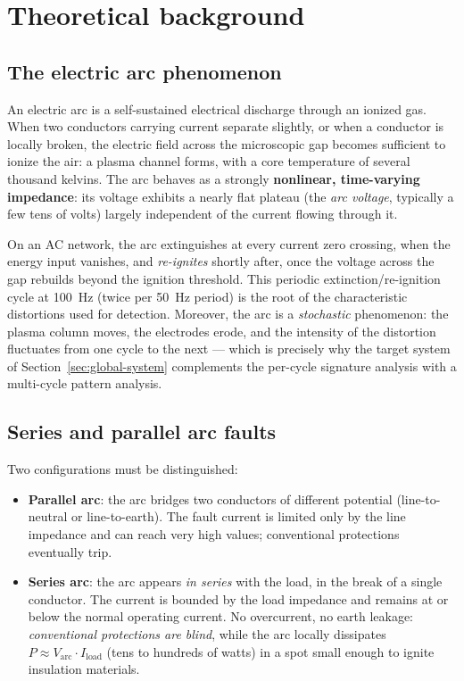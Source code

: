 \section{Theoretical background}

\subsection{The electric arc phenomenon}

An electric arc is a self-sustained electrical discharge through an ionized gas. When two conductors carrying current separate slightly, or when a conductor is locally broken, the electric field across the microscopic gap becomes sufficient to ionize the air: a plasma channel forms, with a core temperature of several thousand kelvins. The arc behaves as a strongly \textbf{nonlinear, time-varying impedance}: its voltage exhibits a nearly flat plateau (the \emph{arc voltage}, typically a few tens of volts) largely independent of the current flowing through it.

\medskip

On an AC network, the arc extinguishes at every current zero crossing, when the energy input vanishes, and \emph{re-ignites} shortly after, once the voltage across the gap rebuilds beyond the ignition threshold. This periodic extinction/re-ignition cycle at 100~Hz (twice per 50~Hz period) is the root of the characteristic distortions used for detection. Moreover, the arc is a \emph{stochastic} phenomenon: the plasma column moves, the electrodes erode, and the intensity of the distortion fluctuates from one cycle to the next --- which is precisely why the target system of Section~\ref{sec:global-system} complements the per-cycle signature analysis with a multi-cycle pattern analysis.

\subsection{Series and parallel arc faults}

Two configurations must be distinguished:

\begin{itemize}[itemsep=2pt]
    \item \textbf{Parallel arc}: the arc bridges two conductors of different potential (line-to-neutral or line-to-earth). The fault current is limited only by the line impedance and can reach very high values; conventional protections eventually trip.
    \item \textbf{Series arc}: the arc appears \emph{in series} with the load, in the break of a single conductor. The current is bounded by the load impedance and remains at or below the normal operating current. No overcurrent, no earth leakage: \emph{conventional protections are blind}, while the arc locally dissipates $P \approx V_{\text{arc}} \cdot I_{\text{load}}$ (tens to hundreds of watts) in a spot small enough to ignite insulation materials.
\end{itemize}

